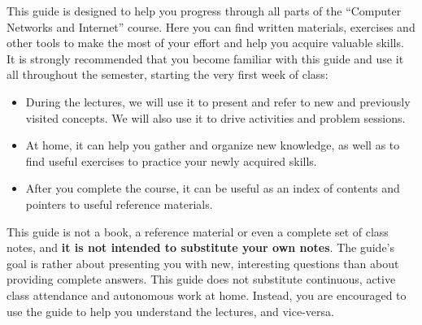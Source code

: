 This guide is designed to help you progress through all parts of the ``Computer Networks and Internet'' course.
Here you can find written materials, exercises and other tools to make the most of your effort and help you acquire
valuable skills. It is strongly recommended that you become familiar with this guide and use it all throughout the semester, starting
the very first week of class:
\begin{itemize}
\item During the lectures, we will use it to present and refer to new and previously visited concepts. 
      We will also use it to drive activities and problem sessions.
      
\item At home, it can help you gather and organize new knowledge, as well as to find useful exercises to practice
      your newly acquired skills.
      
\item After you complete the course, it can be useful as an index of contents and pointers to useful reference materials.
\end{itemize}

\begin{remark}
This guide is not a book, a reference material or even a complete set of class notes, and
\textbf{it is not intended to substitute your own notes}. 
The guide's goal is rather about presenting you with new, interesting questions than about providing complete answers.
This guide does not substitute continuous, active class attendance and autonomous work at home.
Instead, you are encouraged to use the guide to help you understand the lectures, and vice-versa.
\end{remark}



 
